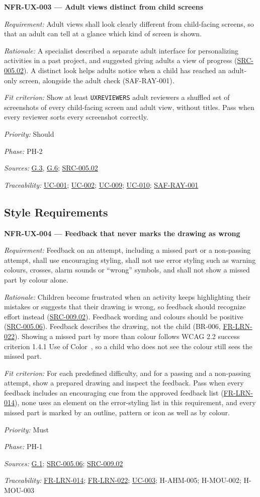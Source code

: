 \documentclass[12pt]{article}
\renewcommand{\_}{\textunderscore\allowbreak}%
\newcommand{\goalref}[1]{\hyperref[goal:#1]{G.#1}}
\newcommand{\ucref}[1]{\hyperref[uc:#1]{\mbox{UC-#1}}}
\newenvironment{srsrequirement}[2]{%
  \par\medskip\noindent\phantomsection\label{req:#1}%
  \textbf{#1 --- #2}\par\nobreak\smallskip }{\par\medskip}
\newcommand{\reqfield}[2]{\noindent\textit{#1:} #2\par}
\newcommand{\reqshall}[1]{\reqfield{Requirement}{#1}}
\newcommand{\reqrationale}[1]{\reqfield{Rationale}{#1}}
\newcommand{\reqfit}[1]{\reqfield{Fit criterion}{#1}}
\newcommand{\reqpriority}[1]{\reqfield{Priority}{#1}}
\newcommand{\reqphase}[1]{\reqfield{Phase}{#1}}
\newcommand{\reqsources}[1]{\reqfield{Sources}{#1}}
\newcommand{\reqtraces}[1]{\reqfield{Traceability}{#1}}
\newcommand{\reqref}[1]{\hyperref[req:#1]{#1}}
\newcommand{\srcref}[1]{\hyperref[src:#1]{SRC-#1}}
\providecommand{\ucref}[1]{\hyperref[uc:#1]{UC-#1}}
\begin{document}
\begin{srsrequirement}{NFR-UX-003}{Adult views distinct from child screens}
  \reqshall{Adult views shall look clearly different from child-facing screens,
so that an adult can tell at a glance which kind of screen is shown.}
\reqrationale{A specialist described a separate adult interface for
personalizing activities in a past project, and suggested giving adults a view
of progress (\srcref{005.02}). A distinct look helps adults
notice when a child has reached an adult-only screen, alongside the adult check
(SAF-RAY-001).} \reqfit{Show at least \texttt{UX\_REVIEWERS} adult reviewers a
shuffled set of screenshots of every child-facing screen and adult view, without
titles. Pass when every reviewer sorts every screenshot correctly.}
  \reqpriority{Should}
  \reqphase{PH-2}
  \reqsources{\goalref{3}, \goalref{6}; \srcref{005.02}} \reqtraces{\ucref{001};
  \ucref{002}; \ucref{009}; \ucref{010}; \reqref{SAF-RAY-001}}
\end{srsrequirement}

\subsection{Style Requirements}
\label{sec:style}

\begin{srsrequirement}{NFR-UX-004}{Feedback that never marks the drawing as
wrong} \reqshall{Feedback on an attempt, including a missed part or a
non-passing attempt, shall use encouraging styling, shall not use error styling
such as warning colours, crosses, alarm sounds or ``wrong'' symbols, and shall
not show a missed part by colour alone.} \reqrationale{Children become
frustrated when an activity keeps highlighting their mistakes or suggests that
their drawing is wrong, so feedback should recognize effort instead
(\srcref{009.02}). Feedback wording and colours should be positive
(\srcref{005.06}). Feedback describes the drawing, not the child (BR-006,
\mbox{\reqref{FR-LRN-022}}). Showing a missed part by more than colour follows
WCAG 2.2 success criterion 1.4.1 Use of Color~\cite{wcag22}, so a child who does
not see the colour still sees the missed part.} \reqfit{For each predefined
difficulty, and for a passing and a non-passing attempt, show a prepared drawing
and inspect the feedback. Pass when every feedback includes an encouraging cue
from the approved feedback list (\mbox{\reqref{FR-LRN-014}}), none uses an
element on the error-styling list in this requirement, and every missed part is
marked by an outline, pattern or icon as well as by colour.}
  \reqpriority{Must}
  \reqphase{PH-1}
  \reqsources{\goalref{1}; \srcref{005.06}; \srcref{009.02}}
  \reqtraces{\mbox{\reqref{FR-LRN-014}}; \mbox{\reqref{FR-LRN-022}};
  \ucref{003}; H-AHM-005; H-MOU-002; H-MOU-003}
\end{srsrequirement}
\end{document}
